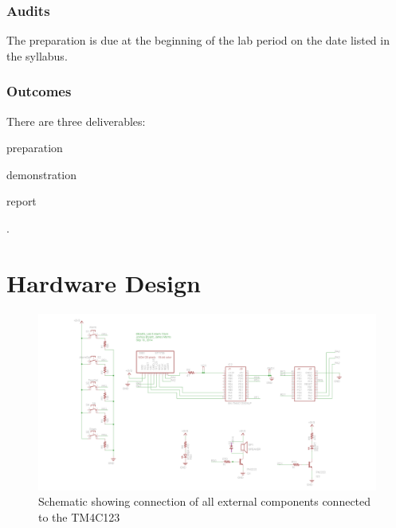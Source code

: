 \documentclass{article}
\begin{document}
		\subsubsection{Audits}
			The preparation is due at the beginning of the lab period on the date listed in the syllabus.
	
		\subsubsection{Outcomes}
			There are three deliverables:
			\begin{inlinelist}
				\item preparation
				\item demonstration
				\item report
			\end{inlinelist}.

 
\section{Hardware Design}
	\begin{figure}[h]
		\includegraphics[keepaspectratio, width=\textwidth]{Lab3Graphics/Schematic.png}
		\caption{Schematic showing connection of all external components connected to the TM4C123}
		\label{fig:schematic}
	\end{figure}

\end{document}
